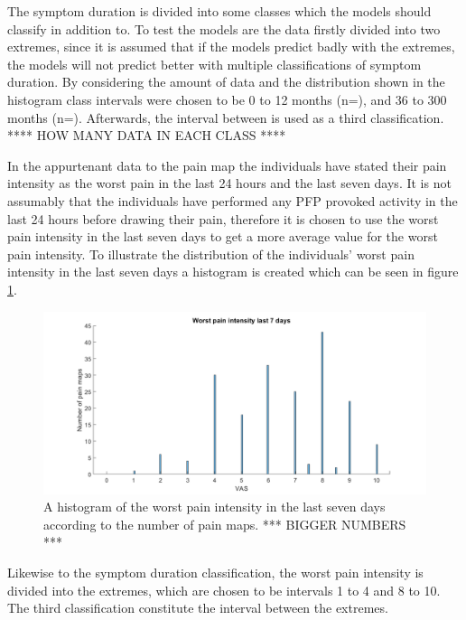 \noindent
The symptom duration is divided into some classes which the models should classify in addition to. To test the models are the data firstly divided into two extremes, since it is assumed that if the models predict badly with the extremes, the models will not predict better with multiple classifications of symptom duration. 
By considering the amount of data and the distribution shown in the histogram class intervals were chosen to be 0 to 12 months (n=), and 36 to 300 months (n=). Afterwards, the interval between is used as a third classification. 
**** HOW MANY DATA IN EACH CLASS ****\newline

\noindent
In the appurtenant data to the pain map the individuals have stated their pain intensity as the worst pain in the last 24 hours and the last seven days.
It is not assumably that the individuals have performed any PFP provoked activity in the last 24 hours before drawing their pain, therefore it is chosen to use the worst pain intensity in the last seven days to get a more average value for the worst pain intensity.
To illustrate the distribution of the individuals’ worst pain intensity in the last seven days a histogram is created which can be seen in figure \ref{fig:histopain}.

\begin{figure} [H]
\centering
\includegraphics[width=1\textwidth]{figures/histrogramPain}
\caption{A histogram of the worst pain intensity in the last seven days according to the number of pain maps.  *** BIGGER NUMBERS ***}
\label{fig:histopain}
\end{figure}

\noindent
Likewise to the symptom duration classification, the worst pain intensity is divided into the extremes, which are chosen to be intervals 1 to 4 and 8 to 10. The third classification constitute the interval between the extremes.



